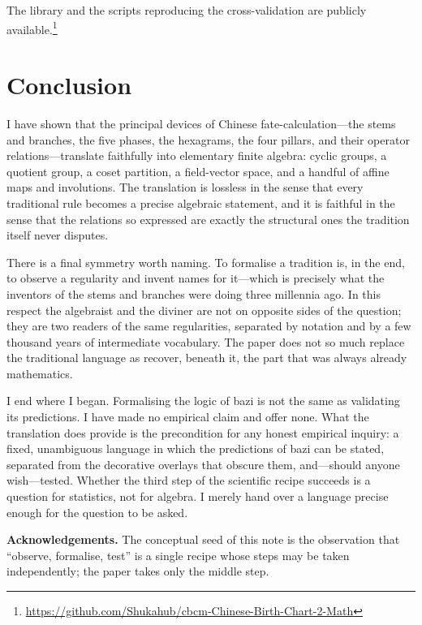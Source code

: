 \documentclass[11pt,a4paper]{article}
\theoremstyle{definition}
\theoremstyle{remark}
\begin{document}
The library and the scripts reproducing the cross-validation are publicly available.\footnote{\url{https://github.com/Shukahub/cbcm-Chinese-Birth-Chart-2-Math}}

\section{Conclusion}\label{sec:conclusion}
I have shown that the principal devices of Chinese fate-calculation---the stems and branches, the five phases, the hexagrams, the four pillars, and their operator relations---translate faithfully into elementary finite algebra: cyclic groups, a quotient group, a coset partition, a field-vector space, and a handful of affine maps and involutions. The translation is lossless in the sense that every traditional rule becomes a precise algebraic statement, and it is faithful in the sense that the relations so expressed are exactly the structural ones the tradition itself never disputes.

There is a final symmetry worth naming. To formalise a tradition is, in the end, to observe a regularity and invent names for it---which is precisely what the inventors of the stems and branches were doing three millennia ago. In this respect the algebraist and the diviner are not on opposite sides of the question; they are two readers of the same regularities, separated by notation and by a few thousand years of intermediate vocabulary. The paper does not so much replace the traditional language as recover, beneath it, the part that was always already mathematics.

I end where I began. Formalising the logic of bazi is not the same as validating its predictions. I have made no empirical claim and offer none. What the translation does provide is the precondition for any honest empirical inquiry: a fixed, unambiguous language in which the predictions of bazi can be stated, separated from the decorative overlays that obscure them, and---should anyone wish---tested. Whether the third step of the scientific recipe succeeds is a question for statistics, not for algebra. I merely hand over a language precise enough for the question to be asked.

\bigskip
\noindent\textbf{Acknowledgements.} The conceptual seed of this note is the observation that ``observe, formalise, test'' is a single recipe whose steps may be taken independently; the paper takes only the middle step.

\clearpage
\appendix
\end{document}
